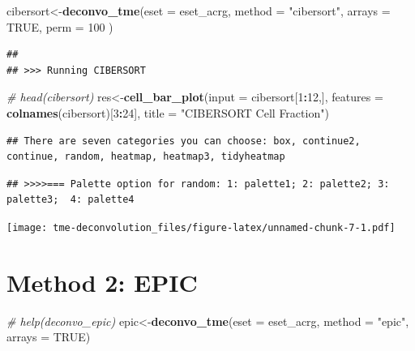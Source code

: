 \documentclass[
  12pt,
]{book}
\newenvironment{Shaded}{\begin{snugshade}}{\end{snugshade}}
\newcommand{\AttributeTok}[1]{\textcolor[rgb]{0.13,0.29,0.53}{#1}}
\newcommand{\CommentTok}[1]{\textcolor[rgb]{0.56,0.35,0.01}{\textit{#1}}}
\newcommand{\ConstantTok}[1]{\textcolor[rgb]{0.56,0.35,0.01}{#1}}
\newcommand{\DecValTok}[1]{\textcolor[rgb]{0.00,0.00,0.81}{#1}}
\newcommand{\FunctionTok}[1]{\textcolor[rgb]{0.13,0.29,0.53}{\textbf{#1}}}
\newcommand{\NormalTok}[1]{#1}
\newcommand{\OtherTok}[1]{\textcolor[rgb]{0.56,0.35,0.01}{#1}}
\newcommand{\SpecialCharTok}[1]{\textcolor[rgb]{0.81,0.36,0.00}{\textbf{#1}}}
\newcommand{\StringTok}[1]{\textcolor[rgb]{0.31,0.60,0.02}{#1}}
\begin{document}
\begin{Shaded}
\begin{Highlighting}[]
\NormalTok{cibersort}\OtherTok{\textless{}{-}}\FunctionTok{deconvo\_tme}\NormalTok{(}\AttributeTok{eset =}\NormalTok{ eset\_acrg, }\AttributeTok{method =} \StringTok{"cibersort"}\NormalTok{, }\AttributeTok{arrays =} \ConstantTok{TRUE}\NormalTok{, }\AttributeTok{perm =} \DecValTok{100}\NormalTok{ )}
\end{Highlighting}
\end{Shaded}

\begin{verbatim}
## 
## >>> Running CIBERSORT
\end{verbatim}

\begin{Shaded}
\begin{Highlighting}[]
\CommentTok{\# head(cibersort)}
\NormalTok{res}\OtherTok{\textless{}{-}}\FunctionTok{cell\_bar\_plot}\NormalTok{(}\AttributeTok{input =}\NormalTok{ cibersort[}\DecValTok{1}\SpecialCharTok{:}\DecValTok{12}\NormalTok{,], }\AttributeTok{features =} \FunctionTok{colnames}\NormalTok{(cibersort)[}\DecValTok{3}\SpecialCharTok{:}\DecValTok{24}\NormalTok{], }\AttributeTok{title =} \StringTok{"CIBERSORT Cell Fraction"}\NormalTok{)}
\end{Highlighting}
\end{Shaded}

\begin{verbatim}
## There are seven categories you can choose: box, continue2, continue, random, heatmap, heatmap3, tidyheatmap
\end{verbatim}

\begin{verbatim}
## >>>>=== Palette option for random: 1: palette1; 2: palette2; 3: palette3;  4: palette4
\end{verbatim}

\texttt{[image: tme-deconvolution\_files/figure-latex/unnamed-chunk-7-1.pdf]}

\hypertarget{method-2-epic}{%
\section{Method 2: EPIC}\label{method-2-epic}}

\begin{Shaded}
\begin{Highlighting}[]
\CommentTok{\# help(deconvo\_epic)}
\NormalTok{epic}\OtherTok{\textless{}{-}}\FunctionTok{deconvo\_tme}\NormalTok{(}\AttributeTok{eset =}\NormalTok{ eset\_acrg, }\AttributeTok{method =} \StringTok{"epic"}\NormalTok{, }\AttributeTok{arrays =} \ConstantTok{TRUE}\NormalTok{)}
\end{Highlighting}
\end{Shaded}
\end{document}
